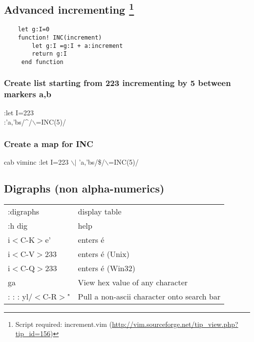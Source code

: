 \documentclass[10pt]{article}
\newenvironment{code}
{\begin{list}{}{\setlength{\leftmargin}{1em}}\item\scriptsize\bfseries}
{\end{list}}
\begin{document}
\subsection*{Advanced incrementing \footnote{Script required: increment.vim (\url{http://vim.sourceforge.net/tip\_view.php?tip\_id=156})}}

\begin{code}

\begin{verbatim}
    let g:I=0
    function! INC(increment)
        let g:I =g:I + a:increment
        return g:I 
     end function
\end{verbatim}
\end{code} 
 
\subsubsection*{Create list starting from 223 incrementing by 5 between markers a,b}
:let I=223\\ 
:'a,'bs/\^{}/$\backslash$=INC(5)/
 
\subsubsection*{Create a map for INC}
cab viminc :let I=223 $\backslash$$|$ 'a,'bs/\$/$\backslash$=INC(5)/

\subsection*{Digraphs (non alpha-numerics)}
\begin{center}
\begin{longtable}{l|l}
:digraphs                         & display table\\
:h dig                            & help\\
i$<$C-K$>$e'                      & enters é\\
i$<$C-V$>$233                     & enters é (Unix)\\
i$<$C-Q$>$233                     & enters é (Win32)\\
ga                                & View hex value of any character\\
:%
:%
:%
yl/$<$C-R$>$" &  Pull a non-ascii character onto search bar
\end{longtable}
\end{center} 
\end{document}
